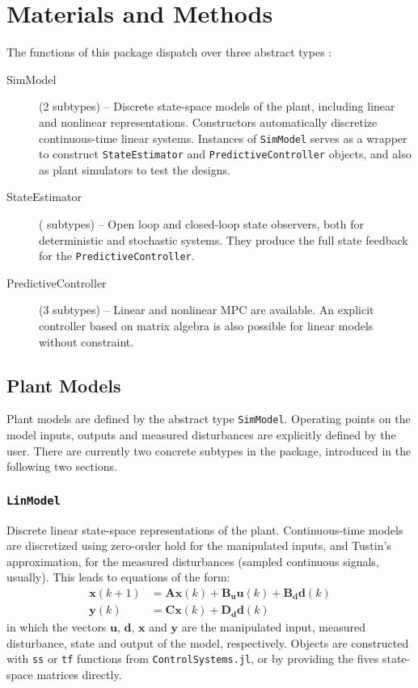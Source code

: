 
\section{Materials and Methods}

The functions of this package dispatch over three abstract types :
\begin{description}
    \item[SimModel] (2 subtypes) -- Discrete state-space models of the plant, including linear and nonlinear representations. Constructors automatically discretize 
    continuous-time linear systems. Instances of \texttt{SimModel} serves as a wrapper to construct \texttt{StateEstimator} and \texttt{PredictiveController} objects, and also as plant simulators to test the designs.
    \item[StateEstimator] ( subtypes) -- Open loop and closed-loop state observers, both for deterministic and stochastic systems. They produce the full state feedback for the \texttt{PredictiveController}.
    \item[PredictiveController] (3 subtypes) -- Linear and nonlinear MPC are available. An explicit controller based on matrix algebra is also possible for linear models without constraint.
\end{description}

\subsection{Plant Models}

Plant models are defined by the abstract type \texttt{SimModel}. Operating points on the model inputs, outputs and measured disturbances are explicitly defined by the user. There are currently two concrete subtypes in the package, introduced in the following two sections.

\subsubsection{\textnormal{\texttt{LinModel}}}

Discrete linear state-space representations of the plant. Continuous-time models are discretized using zero-order hold for the manipulated inputs, and Tustin's approximation, for the measured disturbances (sampled continuous signals, usually). This leads to equations of the form:
\begin{subequations}
\begin{align}
    \mathbf{x}(k+1) &= \mathbf{A x}(k) + \mathbf{B_u u}(k) + \mathbf{B_d d}(k) \\
    \mathbf{y}(k)   &= \mathbf{C x}(k) + \mathbf{D_d d}(k)
\end{align}
\end{subequations}
in which the vectors $\mathbf{u}$, $\mathbf{d}$, $\mathbf{x}$ and $\mathbf{y}$ are the manipulated input, measured disturbance, state and output of the model, respectively. Objects are constructed with \texttt{ss} or \texttt{tf} functions from \texttt{ControlSystems.jl}, or by providing the fives state-space matrices directly.

